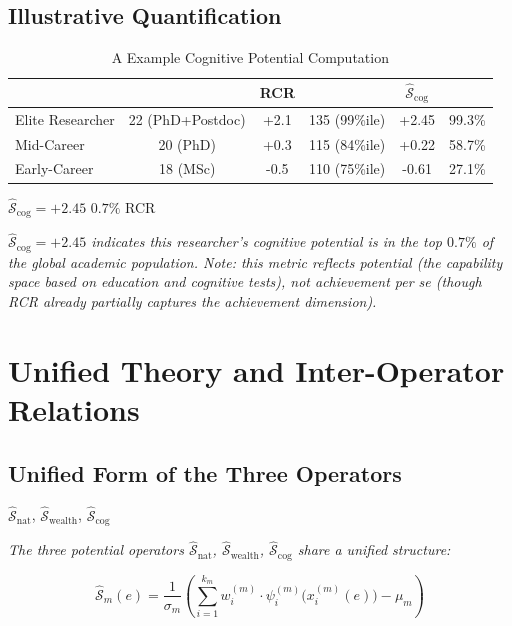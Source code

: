 \documentclass[11pt,a4paper]{article}
\theoremstyle{definition}
\newcommand{\Sop}{\hat{\mathcal{S}}}
\newcommand{\Sopnat}{\hat{\mathcal{S}}_{\text{nat}}}
\newcommand{\Sopwealth}{\hat{\mathcal{S}}_{\text{wealth}}}
\newcommand{\Sopcog}{\hat{\mathcal{S}}_{\text{cog}}}
\begin{document}
\subsection{ Illustrative Quantification}

\begin{table}[htbp]
\centering
\caption{A Example Cognitive Potential Computation}
\label{tab:cog-example}
\begin{tabular}{@{}lccccc@{}}
\toprule
\textbf{} &  & RCR &  & $\Sopcog$ &  \\
\midrule
 Elite Researcher & 22 (PhD+Postdoc) & +2.1 & 135 (99\%ile) & +2.45 & 99.3\% \\
 Mid-Career & 20 (PhD) & +0.3 & 115 (84\%ile) & +0.22 & 58.7\% \\
 Early-Career & 18 (MSc) & -0.5 & 110 (75\%ile) & -0.61 & 27.1\% \\
\bottomrule
\end{tabular}
\end{table}

\noindent $\Sopcog = +2.45$  $0.7\%$ 
\textit{}\textit{}
\textit{}RCR

\medskip
\noindent\textit{$\Sopcog = +2.45$ indicates this researcher's cognitive potential is in the top $0.7\%$ of the global academic population. Note: this metric reflects \textit{potential} (the \textit{capability space} based on education and cognitive tests), not \textit{achievement} per se (though RCR already partially captures the achievement dimension).}

\section{ Unified Theory and Inter-Operator Relations}

\subsection{ Unified Form of the Three Operators}

 $\Sopnat$, $\Sopwealth$, $\Sopcog$ 

\medskip
\noindent\textit{The three potential operators $\Sopnat$, $\Sopwealth$, $\Sopcog$ share a unified structure:}

\begin{equation}
    \boxed{\Sop_m(e) = \frac{1}{\sigma_m} \left( \sum_{i=1}^{k_m} w_i^{(m)} \cdot \psi_i^{(m)}\big(x_i^{(m)}(e)\big) - \mu_m \right)}
    \label{eq:unified}
\end{equation}
\end{document}

